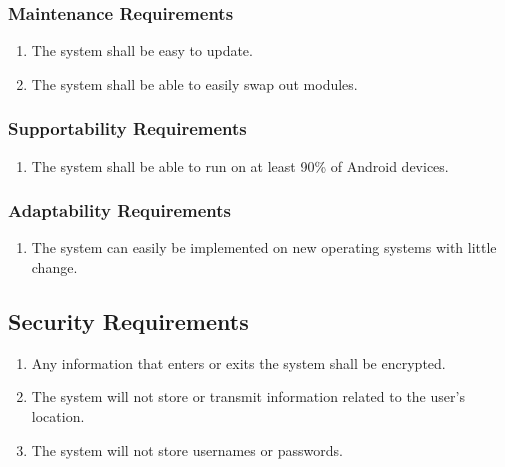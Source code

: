 \documentclass[titlepage]{article}
\newcounter{req}
\begin{document}
		\subsubsection{Maintenance Requirements}
		\label{ssub:maintenance_requirements}
		\begin{enumerate}[{MS}1. ]
		\setcounter{enumi}{\value{req}}
			\item 
			The system shall be easy to update.
			\item
			The system shall be able to easily swap out modules.
		\setcounter{req}{\theenumi}
		\end{enumerate}
		
		\subsubsection{Supportability Requirements}
		\label{ssub:supportability_requirements}
		\begin{enumerate}[{MS}1. ]
		\setcounter{enumi}{\value{req}}
			\item 
			The system shall be able to run on at least 90\% of Android devices.
		\setcounter{req}{\theenumi}
		\end{enumerate}
		
		\subsubsection{Adaptability Requirements}
		\label{ssub:adaptability_requirements}
		\begin{enumerate}[{MS}1. ]
		\setcounter{enumi}{\value{req}}
			\item
			The system can easily be implemented on new operating systems with little change.
		\setcounter{req}{\theenumi}
		\end{enumerate}
		
		
		\subsection{Security Requirements}
		\setcounter{req}{0}
		\label{sub:security_requirements}
		\begin{enumerate}[{SR}1. ]
		\setcounter{enumi}{\value{req}}
			\item
			Any information that enters or exits the system shall be encrypted.
			\item
			The system will not store or transmit information related to the user's location.
			\item
			The system will not store usernames or passwords.
		\setcounter{req}{\theenumi}
		\end{enumerate}
		
\end{document}
